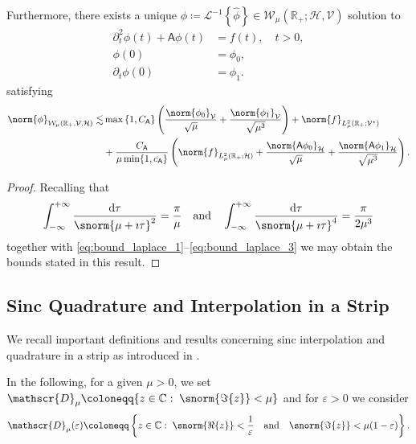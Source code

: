 \begin{corollary}
Furthermore, there exists a unique
$\phi \coloneqq \mathcal{L}^{-1}\left\{\widehat{\phi}\right\} \in \mathcal{W}_\mu(\mathbb{R}_+;\mathcal{H},\mathcal{V})$
solution to 
\begin{align}
    \partial^2_t \phi (t)    +  \mathsf{A}  \phi (t)    &=    f(t),    \quad t>0,\\
    \phi(0) &= \phi_0 ,\\
    \partial_t \phi(0) &= \phi_1. 
\end{align}
satisfying
\begin{equation}
\begin{aligned}
	\norm{\phi}_{\mathcal{W}_\mu(\mathbb{R}_+,\mathcal{V},\mathcal{H})}
	\lesssim
    &
	\max\left\{1,C_{\mathsf{A}}\right\}
	\left(
   		\frac{\norm{\phi_0}_{\mathcal{V}}}{\sqrt{\mu}}
		+
		\frac{\norm{\phi_1}_{\mathcal{V}}}{\sqrt{\mu^3}}
	\right)
    +
    \norm{{f}}_{{L^2_\mu(\mathbb{R}_+;\mathcal{V}^\star)}}
    \\
    &
    +
	\frac{C_{\mathsf{A}}}{{\mu}\min\{1, c_{\mathsf{A}}\}}
	\left(
		\norm{{f}}_{{L^2_\mu(\mathbb{R}_+;\mathcal{H})}} 
		+ 
		\frac{\norm{\mathsf{A}\phi_0}_{\mathcal{H}}}{\sqrt{\mu}}
		+
		\frac{\norm{\mathsf{A}\phi_1}_{\mathcal{H}}}{\sqrt{\mu^3}}
	\right).
\end{aligned}
\end{equation}
\end{corollary}

\begin{proof}
Recalling that
\begin{equation}\label{eq:bound_integral_mu}
	\int_{-\infty}^{+\infty}
	\frac{	\text{d}
	\tau}{\snorm{\mu + \imath \tau}^2}
	=
	\frac{\pi}{\mu}
	\quad
	\text{and}
	\quad
	\int_{-\infty}^{+\infty}
	\frac{	\text{d}
	\tau}{\snorm{\mu + \imath \tau}^4}
	=
	\frac{\pi}{2\mu^3}
\end{equation}
together with \eqref{eq:bound_laplace_1}--\eqref{eq:bound_laplace_3} we may obtain
the bounds stated in this result. 

\end{proof}

\subsection{Sinc Quadrature and Interpolation in a Strip}\label{ssec:sinc}
We recall important definitions and results concerning sinc interpolation
and quadrature in a strip as introduced in \cite[Chapter 3]{stenger2012numerical}.

In the following, for a given $\mu>0$, we set $\mathscr{D}_\mu \coloneqq \{z \in \mathbb{C}:\; \snorm{\Im\{z\}} < \mu\}$ and for $\varepsilon>0$ we consider
\begin{equation}
    \mathscr{D}_\mu(\varepsilon)
    \coloneqq
    \left\{
        z \in \mathbb{C}:
        \;
        \snorm{\Re\{z\}}< \frac{1}{\varepsilon}
        \quad
        \text{and}
        \quad
        \snorm{\Im\{z\}}< \mu(1-{\varepsilon})
    \right\}.
\end{equation}


